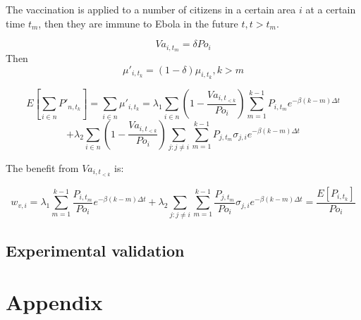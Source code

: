 \documentclass[12pt]{article}
\begin{document}
The vaccination is applied to a number of citizens in a certain area $i$ at a certain time $t_m$, then they are immune to Ebola in the future $t,t>t_m$.

$$Va_{i,t_m} = \delta Po_i $$
Then 
$$\mu'_{i,t_k} =(1 - \delta) \mu_{i,t_k} , k > m $$ 


$$
E[\sum_{i \in n} {P'_{n,t_k}}] = \sum_{i \in n} \mu'_{i,t_k} = \lambda_1 \sum_{i \in n} \left( 1 - \frac{Va_{i,t_{ < k}}}{Po_i} \right) \sum_{m = 1}^{ k-1} P_{i,t_m} e^{-\beta(k-m)\Delta t} $$
$$ + \lambda_2 \sum_{i \in n}\left( 1 - \frac{Va_{i,t_{< k}}}{Po_i}\right) \sum_{j:j\neq i} \sum_{m = 1}^{ k-1} P_{j,t_m} \sigma_{j,i} e^{-\beta(k-m)\Delta t}
$$

The benefit from $Va_{i,t_{ < k}}$ is:

$$
w_{v,i} = \lambda_1 \sum_{m = 1}^{ k-1} \frac{P_{i,t_m}}{Po_{i}} e^{-\beta(k-m)\Delta t} + \lambda_2 \sum_{j:j\neq i} \sum_{m = 1}^{ k-1} \frac{P_{j,t_m}}{Po_{i}} \sigma_{j,i} e^{-\beta(k-m)\Delta t} = \frac{E[P_{i,t_k}]}{Po_{i}}
$$





\subsection{Experimental validation}



\section*{Appendix}





\end{document}
